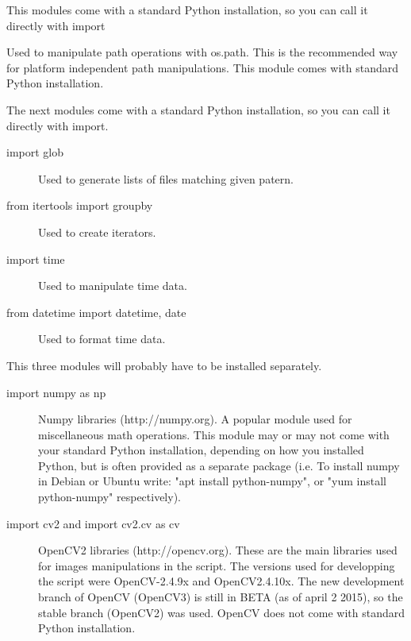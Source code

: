 \documentclass[a4paper, 11pt]{article}
\begin{document}
\begin{description}
\item This modules come with a standard Python installation, so you can call it directly with import

\begin{description}
\item [import os]
Used to manipulate path operations with os.path. This is the recommended way for platform independent path manipulations. This module comes with standard Python installation.
\item The next modules come with a standard Python installation, so you can call it directly with import.

\begin{description}
\item[import glob] Used to generate lists of files matching given patern. %
\item [from itertools import groupby] Used to create iterators. %
\item [import time] Used to manipulate time data. %
\item [from datetime import datetime, date] Used to format time data. %
\end{description}

\item This three modules will probably have to be installed separately.

\begin{description}
\item [import numpy as np] Numpy libraries (http://numpy.org). A popular module used for miscellaneous math operations. This module may or may not come with your standard Python installation, depending on how you installed Python, but is often provided as a separate package (i.e. To install numpy in Debian or Ubuntu write: "apt install python-numpy", or "yum install python-numpy" respectively).

\item [import cv2 and import cv2.cv as cv] OpenCV2 libraries (http://opencv.org). These are the main libraries used for images manipulations in the script. The versions used for developping the script were OpenCV-2.4.9x and OpenCV2.4.10x. The new development branch of OpenCV (OpenCV3) is still in BETA (as of april 2 2015), so the stable branch (OpenCV2) was used. OpenCV does not come with standard Python installation.


\end{description}
\end{description}
\end{description}
\end{document}
